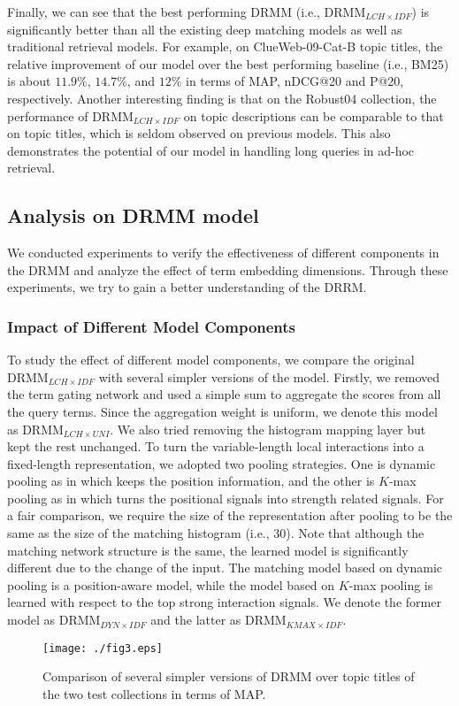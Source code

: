 \documentclass{sig-alternate-05-2015}
\begin{document}
Finally, we can see that the best performing DRMM (i.e., DRMM$_{LCH\times IDF}$) is significantly better than all the existing deep matching models as well as traditional retrieval \mbox{models}. For example, on ClueWeb-09-Cat-B topic titles, the relative improvement of our model over the best performing baseline (i.e., BM25) is about $11.9\%$, $14.7\%$, and $12\%$ in terms of MAP, nDCG@20 and P@20, respectively. Another interesting finding is that on the Robust04 collection, the performance of DRMM$_{LCH\times IDF}$ on topic descriptions can be comparable to that on topic titles, which is seldom observed on previous models. This also demonstrates the potential of our model in handling long queries in ad-hoc retrieval.


\subsection{Analysis on DRMM model}
We conducted experiments to verify the effectiveness of different components in the DRMM and analyze the effect of term embedding dimensions. Through these experiments, we try to gain a better understanding of the DRRM.

\subsubsection{Impact of Different Model Components}
To study the effect of different model components, we compare the original DRMM$_{LCH\times IDF}$ with several simpler versions of the model. Firstly, we removed the term gating network and used a simple sum to aggregate the scores from all the query terms. Since the aggregation weight is uniform, we denote this model as DRMM$_{LCH\times UNI}$. We also tried removing the histogram mapping layer but kept the rest unchanged. To turn the variable-length local interactions into a fixed-length representation, we adopted two pooling strategies. One is dynamic pooling as in \cite{socher2011dynamic,pang2016text} which keeps the position information, and the other is $K$-max pooling as in \cite{wan2015deep} which turns the positional signals into strength related signals. For a fair comparison, we require the size of the representation after pooling to be the same as the size of the matching histogram (i.e., $30$). Note that although the matching network structure is the same, the learned model is significantly different due to the change of the input. The matching model based on dynamic pooling is a position-aware model, while the model based on $K$-max pooling is learned with respect to the top strong interaction signals. We denote the former model as DRMM$_{DYN\times IDF}$ and the latter as DRMM$_{KMAX\times IDF}$.
\begin{figure}[tbp]
\centering
\texttt{[image: ./fig3.eps]}
\caption{Comparison of several simpler versions of DRMM over topic titles of the two test collections in terms of MAP.}\label{fig3}
\end{figure}
\end{document}

